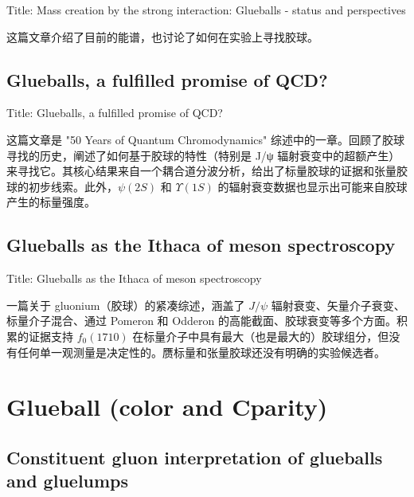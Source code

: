 \documentclass{article}
\begin{document}
Title: Mass creation by the strong interaction: Glueballs - status and perspectives \cite{wiedner2026masscreationstronginteraction}

这篇文章介绍了目前的能谱，也讨论了如何在实验上寻找胶球。


\subsection{Glueballs, a fulfilled promise of QCD?}

Title: \quad Glueballs, a fulfilled promise of QCD? \cite{klempt2022glueballsfulfilledpromiseqcd}

这篇文章是 "50 Years of Quantum Chromodynamics" 综述中的一章。回顾了胶球寻找的历史，阐述了如何基于胶球的特性（特别是 J/ψ 辐射衰变中的超额产生）来寻找它。其核心结果来自一个耦合道分波分析，给出了标量胶球的证据和张量胶球的初步线索。此外，$\psi(2S)$ 和 $\Upsilon(1S)$ 的辐射衰变数据也显示出可能来自胶球产生的标量强度。


\subsection{Glueballs as the Ithaca of meson spectroscopy}

Title: \quad Glueballs as the Ithaca of meson spectroscopy \cite{llanesestrada2021glueballsithacamesonspectroscopy}

一篇关于 gluonium（胶球）的紧凑综述，涵盖了 $J/\psi$ 辐射衰变、矢量介子衰变、标量介子混合、通过 Pomeron 和 Odderon 的高能截面、胶球衰变等多个方面。积累的证据支持 $f_0(1710)$ 在标量介子中具有最大（也是最大的）胶球组分，但没有任何单一观测量是决定性的。赝标量和张量胶球还没有明确的实验候选者。




















\section{Glueball (color and Cparity)}

\subsection{Constituent gluon interpretation of glueballs and gluelumps }
\end{document}
